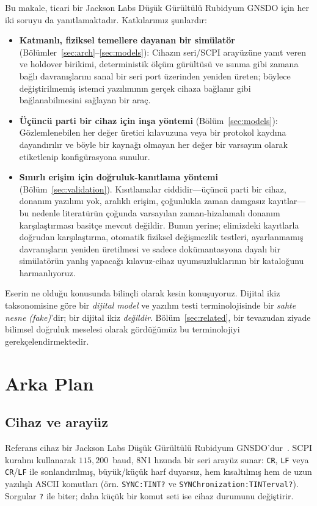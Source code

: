 \documentclass[9pt,twocolumn,a4paper]{extarticle}
\begin{document}
Bu makale, ticari bir Jackson Labs Düşük Gürültülü Rubidyum GNSDO için her iki soruyu da yanıtlamaktadır. Katkılarımız şunlardır:
\begin{itemize}
\item \textbf{Katmanlı, fiziksel temellere dayanan bir simülatör} (Bölümler~\ref{sec:arch}--\ref{sec:models}): Cihazın seri/SCPI arayüzüne yanıt veren ve holdover birikimi, deterministik ölçüm gürültüsü ve ısınma gibi zamana bağlı davranışlarını sanal bir seri port üzerinden yeniden üreten; böylece değiştirilmemiş istemci yazılımının gerçek cihaza bağlanır gibi bağlanabilmesini sağlayan bir araç.
\item \textbf{Üçüncü parti bir cihaz için inşa yöntemi} (Bölüm~\ref{sec:models}): Gözlemlenebilen her değer üretici kılavuzuna veya bir protokol kaydına dayandırılır ve böyle bir kaynağı olmayan her değer bir varsayım olarak etiketlenip konfigürasyona sunulur.
\item \textbf{Sınırlı erişim için doğruluk-kanıtlama yöntemi} (Bölüm~\ref{sec:validation}). Kısıtlamalar ciddidir---üçüncü parti bir cihaz, donanım yazılımı yok, aralıklı erişim, çoğunlukla zaman damgasız kayıtlar---bu nedenle literatürün çoğunda varsayılan zaman-hizalamalı donanım karşılaştırması basitçe mevcut değildir. Bunun yerine; elimizdeki kayıtlarla doğrudan karşılaştırma, otomatik fiziksel değişmezlik testleri, ayarlanmamış davranışların yeniden üretilmesi ve sadece dokümantasyona dayalı bir simülatörün yanlış yapacağı kılavuz-cihaz uyumsuzluklarının bir kataloğunu harmanlıyoruz.
\end{itemize}

Eserin ne olduğu konusunda bilinçli olarak kesin konuşuyoruz. Dijital ikiz taksonomisine göre bir \emph{dijital model} ve yazılım testi terminolojisinde bir \emph{sahte nesne (fake)}'dir; bir dijital ikiz \emph{değildir}. Bölüm~\ref{sec:related}, bir tevazudan ziyade bilimsel doğruluk meselesi olarak gördüğümüz bu terminolojiyi gerekçelendirmektedir.

\section{Arka Plan}
\label{sec:background}
\subsection{Cihaz ve arayüz}
Referans cihaz bir Jackson Labs Düşük Gürültülü Rubidyum GNSDO'dur~\cite{jacksonlabs2015lnrb}. SCPI kuralını kullanarak $115{,}200$~baud, 8N1 hızında bir seri arayüz sunar: \texttt{CR}, \texttt{LF} veya \texttt{CR}/\texttt{LF} ile sonlandırılmış, büyük/küçük harf duyarsız, hem kısaltılmış hem de uzun yazılışlı ASCII komutları (örn. \texttt{SYNC:TINT?} ve \texttt{SYNChronization:TINTerval?}). Sorgular \texttt{?} ile biter; daha küçük bir komut seti ise cihaz durumunu değiştirir.
\end{document}
